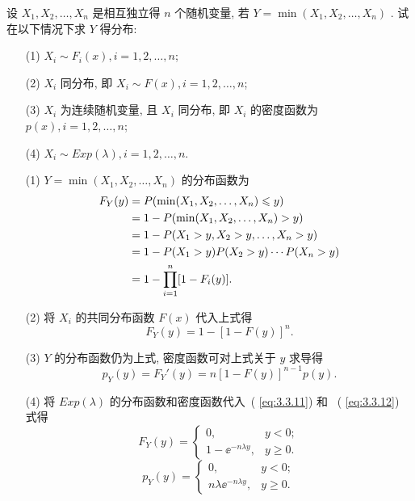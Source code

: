    \begin{example}[最小值分布]\label{exam:3.3.5}
   	设 $X_1,X_2,\ldots,X_n$ 是相互独立得 $n$ 个随机变量, 若 $Y=\min(X_1,X_2,\ldots,X_n)$ . 试在以下情况下求 $Y$ 得分布:
   	\begin{itemize}
   		\item[(1)] $X_i\sim F_i(x),i=1,2,\ldots,n$;
   		\item[(2)] $X_i$ 同分布, 即 $X_i\sim F(x),i=1,2,\ldots,n$;
   		\item[(3)] $X_i$ 为连续随机变量, 且 $X_i$ 同分布, 即 $X_i$ 的密度函数为 $p(x),i=1,2,\ldots,n$;
   		\item[(4)] $X_i\sim Exp(\lambda),i=1,2,\ldots,n$.
   	\end{itemize}
   	\begin{solution}
   		\begin{itemize}
   			\item[(1)] $Y=\min(X_1,X_2,\ldots,X_n)$ 的分布函数为
   			\begin{align}
   				F_Y(y)&=P(\min(X_1,X_2,\ldots,X_n)\leqslant y)\notag\\
   				&=1-P(\min(X_1,X_2,\ldots,X_n)>y)\notag\\
   				&=1-P(X_1>y,X_2>y,\ldots,X_n>y)\notag\\
   				&=1-P(X_1>y)P(X_2>y)\cdots P(X_n>y)\notag\\
   				&=1-\prod_{i=1}^{n}[1-F_i(y)].\label{eq:3.3.10}
   			\end{align}
   			\item[(2)] 将 $X_i$ 的共同分布函数 $F(x)$ 代入上式得
   			\begin{equation}
   				F_Y(y)=1-[1-F(y)]^n.\label{eq:3.3.11}
   			\end{equation}
   			\item[(3)] $Y$ 的分布函数仍为上式, 密度函数可对上式关于 $y$ 求导得
   			\begin{equation}
   				p_Y(y)=F_Y'(y)=n[1-F(y)]^{n-1}p(y).\label{eq:3.3.12}
   			\end{equation}
   			\item[(4)] 将 $Exp(\lambda)$ 的分布函数和密度函数代入~( \eqref{eq:3.3.11}) 和 ~( \eqref{eq:3.3.12}) 式得
   			\begin{equation*}
   				F_Y(y)=\begin{cases}
   					0, & y<0;\\
   					1-\ee^{-n\lambda y}, & y\geqslant0.
   				\end{cases}
   			\end{equation*}
   			\begin{equation*}
   				p_Y(y)=\begin{cases}
   					0, & y<0;\\
   					n\lambda\ee^{-n\lambda y}, & y\geqslant0.
   				\end{cases}
   			\end{equation*}
   		\end{itemize}
   	\end{solution}
   \end{example}

